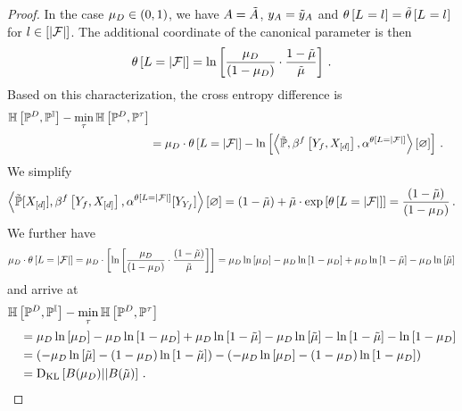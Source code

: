 \begin{proof}
    In the case $\mu_{D}\in(0,1)$, we have $A=\tilde{A}$, $y_{A}=\tilde{y}_{A}$ and $\theta\left[L_{}=l_{}\right]=\tilde{\theta}\left[L_{}=l_{}\right]$ for $l\in[\left|\mathcal{F}\right|]$.
    The additional coordinate of the canonical parameter is then
    \begin{align*}
        \theta\left[L=\left|\mathcal{F}\right|\right] = \ln \left[ 
            \frac{\mu_{D}}{(1-\mu_{D})}
            \cdot \frac{1-\tilde{\mu}}{\tilde{\mu}}
         \right] \, .
    \end{align*}
    Based on this characterization, the cross entropy difference is
    \begin{align*}
        \mathbb{H}\left[\mathbb{P}^{D},\mathbb{P}^{\mathbb{I}}\right] - \min_{\tau} \mathbb{H}\left[\mathbb{P}^{D},\mathbb{P}^{\tau}\right] \\
        &= \mu_{D} \cdot \theta\left[L=\left|\mathcal{F}\right|\right]
        - \ln \left[ \left\langle \tilde{\mathbb{P}},\beta^{f}\left[Y_{f},X_{[d]}\right],\alpha^{\theta\left[L=\left|\mathcal{F}\right|\right]}\right\rangle \left[ \varnothing \right] \right] \, .
    \end{align*}
    We simplify
    \begin{align*}
        \left\langle \tilde{\mathbb{P}}[X_{[d]}],\beta^{f}\left[Y_{f},X_{[d]}\right],\alpha^{\theta\left[L=\left|\mathcal{F}\right|\right]}[Y_{Y_{f}}]\right\rangle \left[ \varnothing \right]
        = (1-\tilde{\mu}) + \tilde{\mu} \cdot \mathrm{exp}\left[\theta\left[L=\left|\mathcal{F}\right|\right]\right]
        = \frac{(1-\tilde{\mu})}{(1-\mu_{D})} \, .
    \end{align*}
    We further have
    \begin{align*}
        \mu_{D} \cdot \theta\left[L=\left|\mathcal{F}\right|\right]
        = \mu_{D} \cdot \left[ \ln \left[ \frac{\mu_{D}}{(1-\mu_{D})}\cdot \frac{(1-\tilde{\mu})}{\tilde{\mu}} \right]  \right]
        = \mu_{D} \ln \left[ \mu_{D} \right] - \mu_{D} \ln \left[ 1-\mu_{D} \right] + \mu_{D} \ln \left[ 1-\tilde{\mu} \right] - \mu_{D} \ln \left[ \tilde{\mu} \right]
    \end{align*}
    and arrive at
    \begin{align*}
        &  \mathbb{H}\left[\mathbb{P}^{D},\mathbb{P}^{\mathbb{I}}\right] - \min_{\tau} \mathbb{H}\left[\mathbb{P}^{D},\mathbb{P}^{\tau}\right] \\
        & \quad =  \mu_{D} \ln \left[ \mu_{D} \right] - \mu_{D} \ln \left[ 1-\mu_{D} \right] + \mu_{D} \ln \left[ 1-\tilde{\mu} \right] - \mu_{D} \ln \left[ \tilde{\mu} \right]
        -  \ln \left[ 1-\tilde{\mu} \right] - \ln \left[ 1-\mu_{D} \right] \\
        & \quad = \left( -\mu_{D} \ln \left[ \tilde{\mu} \right] - (1-\mu_{D}) \ln \left[ 1-\tilde{\mu} \right] \right)  - \left( -\mu_{D} \ln \left[ \mu_{D} \right] - (1-\mu_{D}) \ln \left[ 1-\mu_{D} \right] \right) \\
        & \quad = \mathrm{D}_{\mathrm{KL}}\left[ B(\mu_{D}) || B(\tilde{\mu}) \right] \, .
    \end{align*}


\end{proof}
